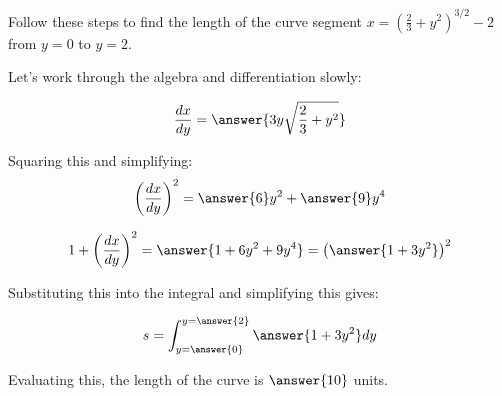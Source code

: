 \documentclass{ximera}
\author{Jim Talamo}
\begin{document}
\begin{exercise}

Follow these steps to find the length of the curve segment $x=\left(\frac{2}{3}+y^2\right)^{3/2} -2$ from $y=0$ to $y=2$.

Let's work through the algebra and differentiation slowly:

\[
\frac{dx}{dy} = \answer{3y\sqrt{\frac{2}{3}+y^2}}
\]
\begin{exercise}
Squaring this and simplifying:
\[
\left(\frac{dx}{dy}\right)^2 = \answer{6}y^2+\answer{9}y^4
\]

\begin{exercise}

\[
1+ \left(\frac{dx}{dy}\right)^2 = \answer{1+6y^2+9y^4} = \left(\answer{1+3y^2}  \right)^2
\]

\begin{exercise}
Substituting this into the integral and simplifying this gives:

\[
s= \int_{y=\answer{0}}^{y=\answer{2}} \answer{1+3y^2} dy 
\]

Evaluating this, the length of the curve is $\answer{10 }$ units.

\end{exercise}
\end{exercise}
\end{exercise}



\end{exercise}
\end{document}
